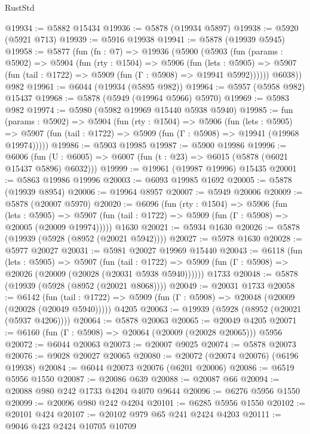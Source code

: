 \begin{lexlean}{RustStd}
\begin{coremodule}
@19934 := @5882 @15434
@19936 := @5878 (@19934 @5897)
@19938 := @5920 (@5921 @713)
@19939 := @5916 @19938
@19941 := @5878 (@19939 @5945)
@19958 := @5877
    (fun (fn : @7) =>
    @19936
      (@5900
        (@5903
          (fun (params : @5902) =>
          @5904
            (fun (rty : @1504) =>
            @5906
              (fun (lets : @5905) =>
              @5907 (fun (tail : @1722) => @5909 (fun (Γ : @5908) => @19941 @5992))))))
        @6038))
    @982
@19961 := @6044 (@19934 (@5895 @982))
@19964 := @5957 (@5958 @982) @15437
@19968 := @5878 (@5949 (@19964 @5966) @5970)
@19969 := @5983 @982
@19974 := @5980 (@5982 @19969 @15440 @5938 @5940)
@19985 := fun (params : @5902) =>
  @5904
    (fun (rty : @1504) =>
    @5906
      (fun (lets : @5905) =>
      @5907 (fun (tail : @1722) => @5909 (fun (Γ : @5908) => @19941 (@19968 @19974)))))
@19986 := @5903 @19985
@19987 := @5900 @19986
@19996 := @6006
    (fun (U : @6005) => @6007 (fun (t : @23) => @6015 (@5878 (@6021 @15437 @5896) @6032)))
@19999 := @19961 (@19987 @19996) @15435
@20001 := @5863 @19986 @19996
@20003 := @6093 @19985 @1692
@20005 := @5878 (@19939 @8954)
@20006 := @19964 @8957
@20007 := @5949 @20006
@20009 := @5878 (@20007 @5970)
@20020 := @6096
    (fun (rty : @1504) =>
    @5906
      (fun (lets : @5905) =>
      @5907 (fun (tail : @1722) => @5909 (fun (Γ : @5908) => @20005 (@20009 @19974)))))
    @1630
@20021 := @5934 @1630
@20026 := @5878 (@19939 (@5928 (@8952 (@20021 @5942))))
@20027 := @5978 @1630
@20028 := @5977 @20027
@20031 := @5981 @20027 @19969 @15440
@20043 := @6118
    (fun (lets : @5905) =>
    @5907
      (fun (tail : @1722) =>
      @5909 (fun (Γ : @5908) => @20026 (@20009 (@20028 (@20031 @5938 @5940))))))
    @1733
@20048 := @5878 (@19939 (@5928 (@8952 (@20021 @8068))))
@20049 := @20031 @1733
@20058 := @6142
    (fun (tail : @1722) => @5909 (fun (Γ : @5908) => @20048 (@20009 (@20028 (@20049 @5940)))))
    @4205
@20063 := @19939 (@5928 (@8952 (@20021 (@5937 @4206))))
@20064 := @5878 @20063
@20065 := @20049 @4205
@20071 := @6160 (fun (Γ : @5908) => @20064 (@20009 (@20028 @20065))) @5956
@20072 := @6044 @20063
@20073 := @20007 @9025
@20074 := @5878 @20073
@20076 := @9028 @20027 @20065
@20080 := @20072 (@20074 @20076) (@6196 @19938)
@20084 := @6044 @20073 @20076 (@6201 @20006)
@20086 := @6519 @5956 @1550
@20087 := @20086 @639
@20088 := @20087 @66
@20094 := @20088 @980 @242 @1733 @4204 @4070 @9644
@20096 := @6276 @5956 @1550
@20099 := @20096 @980 @242 @4204
@20101 := @6285 @5956 @1550
@20102 := @20101 @424
@20107 := @20102 @979 @65 @241 @2424 @4203
@20111 := @9046 @423 @2424 @10705 @10709

\end{coremodule}
\end{lexlean}
